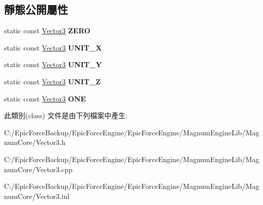 \subsection*{靜態公開屬性}
\begin{DoxyCompactItemize}
\item 
static const \hyperlink{class_magnum_1_1_vector3}{Vector3} {\bfseries Z\+E\+RO}\hypertarget{class_magnum_1_1_vector3_ac97e400f736c7bb2240a6ca960290574}{}\label{class_magnum_1_1_vector3_ac97e400f736c7bb2240a6ca960290574}

\item 
static const \hyperlink{class_magnum_1_1_vector3}{Vector3} {\bfseries U\+N\+I\+T\+\_\+X}\hypertarget{class_magnum_1_1_vector3_a9012f68996a3dfebcd55a339d92a3cd0}{}\label{class_magnum_1_1_vector3_a9012f68996a3dfebcd55a339d92a3cd0}

\item 
static const \hyperlink{class_magnum_1_1_vector3}{Vector3} {\bfseries U\+N\+I\+T\+\_\+Y}\hypertarget{class_magnum_1_1_vector3_abddc6181d833976bd68b53805ee84a68}{}\label{class_magnum_1_1_vector3_abddc6181d833976bd68b53805ee84a68}

\item 
static const \hyperlink{class_magnum_1_1_vector3}{Vector3} {\bfseries U\+N\+I\+T\+\_\+Z}\hypertarget{class_magnum_1_1_vector3_a0e6f94f0b5eba93ab05ce29cafffd584}{}\label{class_magnum_1_1_vector3_a0e6f94f0b5eba93ab05ce29cafffd584}

\item 
static const \hyperlink{class_magnum_1_1_vector3}{Vector3} {\bfseries O\+NE}\hypertarget{class_magnum_1_1_vector3_ae1306872637de95c395268d326b4c4dc}{}\label{class_magnum_1_1_vector3_ae1306872637de95c395268d326b4c4dc}

\end{DoxyCompactItemize}


此類別(class) 文件是由下列檔案中產生\+:\begin{DoxyCompactItemize}
\item 
C\+:/\+Epic\+Force\+Backup/\+Epic\+Force\+Engine/\+Epic\+Force\+Engine/\+Magnum\+Engine\+Lib/\+Magnum\+Core/Vector3.\+h\item 
C\+:/\+Epic\+Force\+Backup/\+Epic\+Force\+Engine/\+Epic\+Force\+Engine/\+Magnum\+Engine\+Lib/\+Magnum\+Core/Vector3.\+cpp\item 
C\+:/\+Epic\+Force\+Backup/\+Epic\+Force\+Engine/\+Epic\+Force\+Engine/\+Magnum\+Engine\+Lib/\+Magnum\+Core/Vector3.\+inl\end{DoxyCompactItemize}
